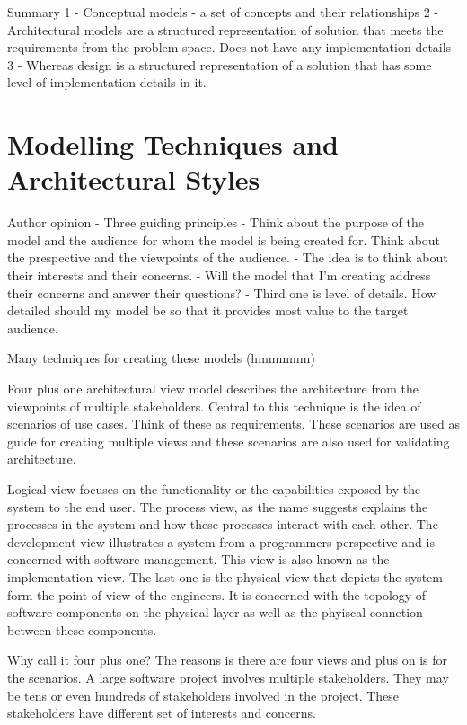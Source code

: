 Summary
1 - Conceptual models - a set of concepts and their relationships
2 - Architectural models are a structured representation of solution that meets the requirements from the problem space. Does not have any implementation details
3 - Whereas design is a structured representation of a solution that has some level of implementation details in it.

\section{Modelling Techniques and Architectural Styles}
Author opinion
- Three guiding principles
- Think about the purpose of the model and the audience for whom the model is being created for. Think about the prespective and the viewpoints of the audience.
    - The idea is to think about their interests and their concerns.
    - Will the model that I'm creating address their concerns and answer their questions?
- Third one is level of details. How detailed should my model be so that it provides most value to the target audience.

Many techniques for creating these models (hmmmmm)

Four plus one architectural view model describes the architecture from the viewpoints of multiple stakeholders.
Central to this technique is the idea of scenarios of use cases. Think of these as requirements.
These scenarios are used as guide for creating multiple views and these scenarios are also used for validating architecture.

Logical view focuses on the functionality or the capabilities exposed by the system to the end user.
The process view, as the name suggests explains the processes in the system and how these processes interact with each other.
The development view illustrates a system from a programmers perspective and is concerned with software management. This view is also known as the implementation view.
The last one is the physical view that depicts the system form the point of view of the engineers.
It is concerned with the topology of software components on the physical layer as well as the phyiscal connetion between these components.


Why call it four plus one?
The reasons is there are four views and plus on is for the scenarios.
A large software project involves multiple stakeholders.
They may be tens or even hundreds of stakeholders involved in the project.
These stakeholders have different set of interests and concerns.

